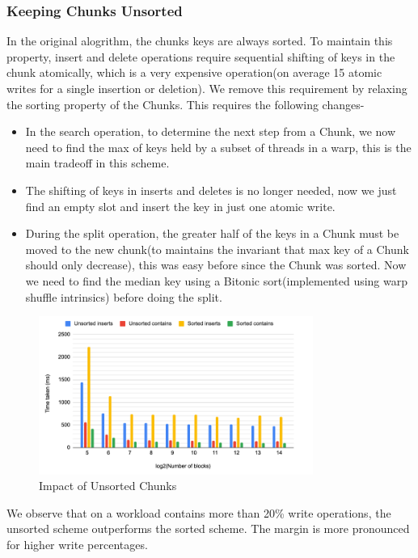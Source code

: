 \documentclass[12pt,a4paper]{article}
\begin{document}
\subsubsection{Keeping Chunks Unsorted}
In the original alogrithm, the chunks keys are always sorted. To maintain this property, insert and delete operations require sequential shifting of keys in the chunk atomically, which is a very expensive operation(on average 15 atomic writes for a single insertion or deletion). We remove this requirement by relaxing the sorting property of the Chunks. This requires the following changes-

\begin{itemize}
    \item In the search operation, to determine the next step from a Chunk, we now need to find the max of keys held by a subset of threads in a warp, this is the main tradeoff in this scheme.
    \item The shifting of keys in inserts and deletes is no longer needed, now we just find an empty slot and insert the key in just one atomic write.
    \item During the split operation, the greater half of the keys in a Chunk must be moved to the new chunk(to maintains the invariant that max key of a Chunk should only decrease), this was easy before since the Chunk was sorted. Now we need to find the median key using a Bitonic sort(implemented using warp shuffle intrinsics) before doing the split.
\end{itemize}


\begin{figure}[H]
    \centering
    \includegraphics[width=0.8\textwidth]{9.png}
    \caption{Impact of Unsorted Chunks}
\end{figure}

We observe that on a workload contains more than 20\% write operations, the unsorted scheme outperforms the sorted scheme. The margin is more pronounced for higher write percentages.
\end{document}
